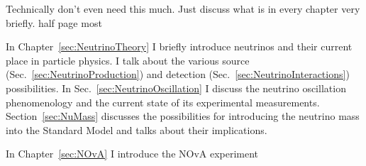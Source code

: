 \label{sec:Introduction}

Technically don't even need this much. Just discuss what is in every chapter very briefly. half page most

In Chapter~\ref{sec:NeutrinoTheory} I briefly introduce neutrinos and their current place in particle physics. I talk about the various source (Sec.~\ref{sec:NeutrinoProduction}) and detection (Sec.~\ref{sec:NeutrinoInteractions}) possibilities. In Sec.~\ref{sec:NeutrinoOscillation} I discuss the neutrino oscillation phenomenology and the current state of its experimental measurements. Section~\ref{sec:NuMass} discusses the possibilities for introducing the neutrino mass into the Standard Model and talks about their implications.

In Chapter~\ref{sec:NOvA} I introduce the NOvA experiment